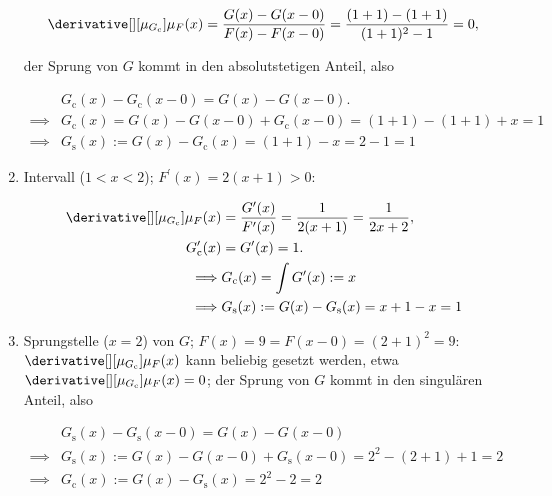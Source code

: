 \begin{solution}
\begin{enumerate}
    \begin{align*}
        \derivative[][\mu_{G_\mathrm{c}}]{\mu_F}(x)
        =
        \frac{G(x) - G(x - 0)}{F(x) - F(x - 0)}
        =
        \frac{(1 + 1) - (1 + 1)}{(1 + 1)^2 - 1}
        =
        0,
    \end{align*}

    der Sprung von $G$ kommt in den absolutstetigen Anteil, also

    \begin{align*}
        &
        G_\mathrm{c}(x) - G_\mathrm{c}(x - 0) = G(x) - G(x - 0). \\
        \implies &
        G_\mathrm{c}(x) = G(x) - G(x - 0) + G_\mathrm{c}(x - 0) = (1 + 1) - (1 + 1) + x = 1 \\
        \implies &
        G_\mathrm{s}(x) := G(x) - G_\mathrm{c}(x) = (1 + 1) - x = 2 - 1 = 1
    \end{align*}

    \item Intervall ($1 < x < 2$); $F^\prime(x) = 2 (x + 1) > 0$:

    \begin{align*}
        \derivative[][\mu_{G_\mathrm{c}}]{\mu_F}(x) & = \frac{G^\prime(x)}{F^\prime(x)} = \frac{1}{2 (x + 1)} = \frac{1}{2 x + 2}, \\
        G_\mathrm{c}^\prime(x) & = G^\prime(x) = 1. \\
        \implies &
        G_\mathrm{c}(x) = \int G^\prime(x) := x \\
        \implies &
        G_\mathrm{s}(x) := G(x) - G_\mathrm{s}(x) = x + 1 - x = 1
    \end{align*}

    \item Sprungstelle ($x = 2$) von $G$; $F(x) = 9 = F(x - 0) = (2 + 1)^2 = 9$: \\
    $\derivative[][\mu_{G_\mathrm{c}}]{\mu_F}(x)$ kann beliebig gesetzt werden, etwa $\derivative[][\mu_{G_\mathrm{c}}]{\mu_F}(x) = 0$;
    der Sprung von $G$ kommt in den singulären Anteil, also

    \begin{align*}
        &
        G_\mathrm{s}(x) - G_\mathrm{s}(x - 0) = G(x) - G(x - 0) \\
        \implies &
        G_\mathrm{s}(x) := G(x) - G(x - 0) + G_\mathrm{s}(x - 0) = 2^2 - (2 + 1) + 1 = 2 \\
        \implies &
        G_\mathrm{c}(x) := G(x) - G_\mathrm{s}(x) = 2^2 - 2 = 2
    \end{align*}


\end{enumerate}
\end{solution}
